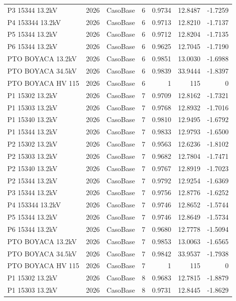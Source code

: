 \documentclass[11pt,a4paper]{article}
\begin{document}
\begin{longtable}{llllrrr}
P3 15344 13.2kV & 2026 & CasoBase & 6 & 0.9734 & 12.8487 & -1.7259 \\
P4 153344 13.2kV & 2026 & CasoBase & 6 & 0.9713 & 12.8210 & -1.7137 \\
P5 15344 13.2kV & 2026 & CasoBase & 6 & 0.9712 & 12.8204 & -1.7135 \\
P6 15344 13.2kV & 2026 & CasoBase & 6 & 0.9625 & 12.7045 & -1.7190 \\
PTO BOYACA 13.2kV & 2026 & CasoBase & 6 & 0.9851 & 13.0030 & -1.6988 \\
PTO BOYACA 34.5kV & 2026 & CasoBase & 6 & 0.9839 & 33.9444 & -1.8397 \\
PTO BOYACA HV 115 & 2026 & CasoBase & 6 & 1 & 115 & 0 \\
P1 15302 13.2kV & 2026 & CasoBase & 7 & 0.9709 & 12.8162 & -1.7321 \\
P1 15303 13.2kV & 2026 & CasoBase & 7 & 0.9768 & 12.8932 & -1.7016 \\
P1 15340 13.2kV & 2026 & CasoBase & 7 & 0.9810 & 12.9495 & -1.6792 \\
P1 15344 13.2kV & 2026 & CasoBase & 7 & 0.9833 & 12.9793 & -1.6500 \\
P2 15302 13.2kV & 2026 & CasoBase & 7 & 0.9563 & 12.6236 & -1.8102 \\
P2 15303 13.2kV & 2026 & CasoBase & 7 & 0.9682 & 12.7804 & -1.7471 \\
P2 15340 13.2kV & 2026 & CasoBase & 7 & 0.9767 & 12.8919 & -1.7023 \\
P2 15344 13.2kV & 2026 & CasoBase & 7 & 0.9792 & 12.9254 & -1.6369 \\
P3 15344 13.2kV & 2026 & CasoBase & 7 & 0.9756 & 12.8776 & -1.6252 \\
P4 153344 13.2kV & 2026 & CasoBase & 7 & 0.9746 & 12.8652 & -1.5744 \\
P5 15344 13.2kV & 2026 & CasoBase & 7 & 0.9746 & 12.8649 & -1.5734 \\
P6 15344 13.2kV & 2026 & CasoBase & 7 & 0.9680 & 12.7778 & -1.5094 \\
PTO BOYACA 13.2kV & 2026 & CasoBase & 7 & 0.9853 & 13.0063 & -1.6565 \\
PTO BOYACA 34.5kV & 2026 & CasoBase & 7 & 0.9842 & 33.9537 & -1.7938 \\
PTO BOYACA HV 115 & 2026 & CasoBase & 7 & 1 & 115 & 0 \\
P1 15302 13.2kV & 2026 & CasoBase & 8 & 0.9683 & 12.7815 & -1.8879 \\
P1 15303 13.2kV & 2026 & CasoBase & 8 & 0.9731 & 12.8445 & -1.8629 \\

\end{longtable}
\end{document}

